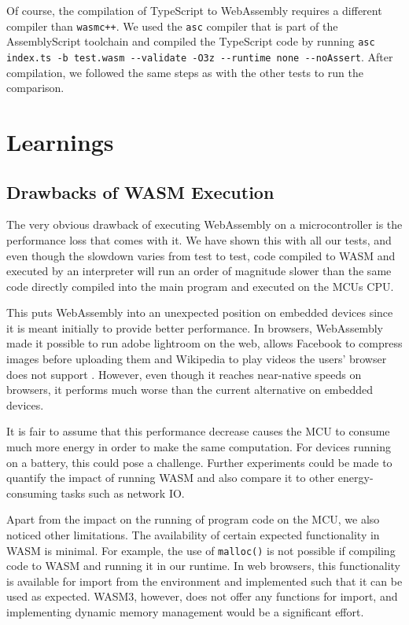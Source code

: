 \begin{sloppypar}
    Of course, the compilation of TypeScript to WebAssembly requires a different compiler than \lstinline{wasmc++}. We used the \lstinline{asc} compiler that is part of the AssemblyScript toolchain and compiled the TypeScript code by running \lstinline{asc index.ts -b test.wasm --validate -O3z --runtime none --noAssert}. After compilation, we followed the same steps as with the other tests to run the comparison.
\end{sloppypar}

\section{Learnings}
\subsection{Drawbacks of WASM Execution}
The very obvious drawback of executing WebAssembly on a microcontroller is the performance loss that comes with it. We have shown this with all our tests, and even though the slowdown varies from test to test, code compiled to WASM and executed by an interpreter will run an order of magnitude slower than the same code directly compiled into the main program and executed on the MCUs CPU.

This puts WebAssembly into an unexpected position on embedded devices since it is meant initially to provide better performance. In browsers, WebAssembly made it possible to run adobe lightroom on the web, allows Facebook to compress images before uploading them and Wikipedia to play videos the users' browser does not support \autocite{wagner_webassembly_2017}. However, even though it reaches near-native speeds on browsers, it performs much worse than the current alternative on embedded devices.

It is fair to assume that this performance decrease causes the MCU to consume much more energy in order to make the same computation. For devices running on a battery, this could pose a challenge. Further experiments could be made to quantify the impact of running WASM and also compare it to other energy-consuming tasks such as network IO.

Apart from the impact on the running of program code on the MCU, we also noticed other limitations. The availability of certain expected functionality in WASM is minimal. For example, the use of \lstinline{malloc()} is not possible if compiling code to WASM and running it in our runtime. In web browsers, this functionality is available for import from the environment and implemented such that it can be used as expected. WASM3, however, does not offer any functions for import, and implementing dynamic memory management would be a significant effort.

